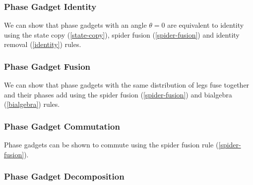 

\subsubsection{Phase Gadget Identity}%

We can show that phase gadgets with an angle $\theta = 0$ are equivalent to identity using the state copy (\ref{state-copy}), spider fusion (\ref{spider-fusion}) and identity removal (\ref{identity}) rules.



\subsubsection{Phase Gadget Fusion}%
\label{phase-gadget-fusion}
We can show that phase gadgets with the same distribution of legs fuse together and their phases add using the spider fusion (\ref{spider-fusion}) and bialgebra (\ref{bialgebra}) rules.



\subsubsection{Phase Gadget Commutation}%
\label{phase-gadget-commutation}

Phase gadgets can be shown to commute using the spider fusion rule (\ref{spider-fusion}).



\subsubsection{Phase Gadget Decomposition}%

